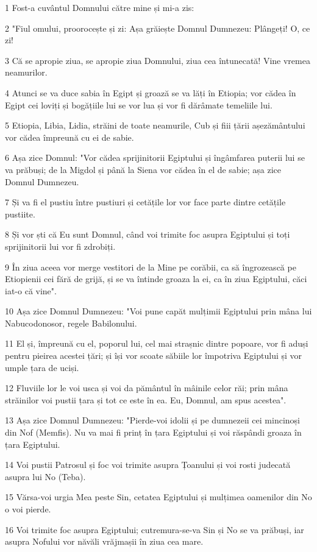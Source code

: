 \par 1 Fost-a cuvântul Domnului către mine și mi-a zis:
\par 2 "Fiul omului, proorocește și zi: Așa grăiește Domnul Dumnezeu: Plângeți! O, ce zi!
\par 3 Că se apropie ziua, se apropie ziua Domnului, ziua cea întunecată! Vine vremea neamurilor.
\par 4 Atunci se va duce sabia în Egipt și groază se va lăți în Etiopia; vor cădea în Egipt cei loviți și bogățiile lui se vor lua și vor fi dărâmate temeliile lui.
\par 5 Etiopia, Libia, Lidia, străini de toate neamurile, Cub și fiii țării așezământului vor cădea împreună cu ei de sabie.
\par 6 Așa zice Domnul: "Vor cădea sprijinitorii Egiptului și îngâmfarea puterii lui se va prăbuși; de la Migdol și până la Siena vor cădea în el de sabie; așa zice Domnul Dumnezeu.
\par 7 Și va fi el pustiu între pustiuri și cetățile lor vor face parte dintre cetățile pustiite.
\par 8 Și vor ști că Eu sunt Domnul, când voi trimite foc asupra Egiptului și toți sprijinitorii lui vor fi zdrobiți.
\par 9 În ziua aceea vor merge vestitori de la Mine pe corăbii, ca să îngrozească pe Etiopienii cei fără de grijă, și se va întinde groaza la ei, ca în ziua Egiptului, căci iat-o că vine".
\par 10 Așa zice Domnul Dumnezeu: "Voi pune capăt mulțimii Egiptului prin mâna lui Nabucodonosor, regele Babilonului.
\par 11 El și, împreună cu el, poporul lui, cel mai strașnic dintre popoare, vor fi aduși pentru pieirea acestei țări; și își vor scoate săbiile lor împotriva Egiptului și vor umple țara de uciși.
\par 12 Fluviile lor le voi usca și voi da pământul în mâinile celor răi; prin mâna străinilor voi pustii țara și tot ce este în ea. Eu, Domnul, am spus acestea".
\par 13 Așa zice Domnul Dumnezeu: "Pierde-voi idolii și pe dumnezeii cei mincinoși din Nof (Memfis). Nu va mai fi prinț în țara Egiptului și voi răspândi groaza în țara Egiptului.
\par 14 Voi pustii Patrosul și foc voi trimite asupra Țoanului și voi rosti judecată asupra lui No (Teba).
\par 15 Vărsa-voi urgia Mea peste Sin, cetatea Egiptului și mulțimea oamenilor din No o voi pierde.
\par 16 Voi trimite foc asupra Egiptului; cutremura-se-va Sin și No se va prăbuși, iar asupra Nofului vor năvăli vrăjmașii în ziua cea mare.
